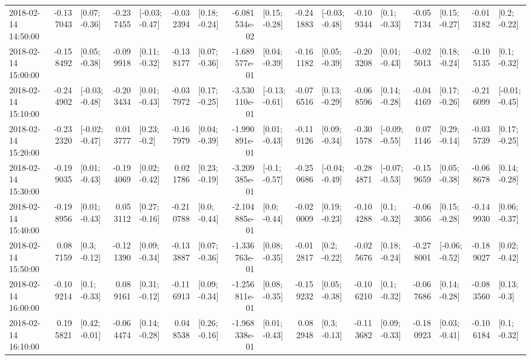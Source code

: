 \begin{tabular}{lrlrlrlrlrlrlrlrl}
2018-02-14 14:50:00 & -0.137043 &   [0.07; -0.36] & -0.237455 &  [-0.03; -0.47] & -0.032394 &   [0.18; -0.24] & -6.081534e-02 &   [0.15; -0.28] & -0.241883 &  [-0.03; -0.48] & -0.109344 &    [0.1; -0.33] & -0.057134 &   [0.15; -0.27] & -0.013182 &    [0.2; -0.22] \\
2018-02-14 15:00:00 & -0.158492 &   [0.05; -0.38] & -0.099918 &   [0.11; -0.32] & -0.138177 &   [0.07; -0.36] & -1.689577e-01 &   [0.04; -0.39] & -0.161182 &   [0.05; -0.39] & -0.203208 &   [0.01; -0.43] & -0.025013 &   [0.18; -0.24] & -0.105135 &    [0.1; -0.32] \\
2018-02-14 15:10:00 & -0.244902 &  [-0.03; -0.48] & -0.203434 &   [0.01; -0.43] & -0.037972 &   [0.17; -0.25] & -3.530110e-01 &  [-0.13; -0.61] & -0.076516 &   [0.13; -0.29] & -0.068596 &   [0.14; -0.28] & -0.044169 &   [0.17; -0.26] & -0.216099 &  [-0.01; -0.45] \\
2018-02-14 15:20:00 & -0.232320 &  [-0.02; -0.47] &  0.013777 &    [0.23; -0.2] & -0.167979 &   [0.04; -0.39] & -1.990891e-01 &   [0.01; -0.43] & -0.119126 &   [0.09; -0.34] & -0.301578 &  [-0.09; -0.55] &  0.071146 &   [0.29; -0.14] & -0.035739 &   [0.17; -0.25] \\
2018-02-14 15:30:00 & -0.199035 &   [0.01; -0.43] & -0.194069 &   [0.02; -0.42] &  0.021786 &   [0.23; -0.19] & -3.209385e-01 &   [-0.1; -0.57] & -0.250686 &  [-0.04; -0.49] & -0.284871 &  [-0.07; -0.53] & -0.159659 &   [0.05; -0.38] & -0.068678 &   [0.14; -0.28] \\
2018-02-14 15:40:00 & -0.198956 &   [0.01; -0.43] &  0.053112 &   [0.27; -0.16] & -0.210788 &    [0.0; -0.44] & -2.104885e-01 &    [0.0; -0.44] & -0.020009 &   [0.19; -0.23] & -0.104288 &    [0.1; -0.32] & -0.063056 &   [0.15; -0.28] & -0.149930 &   [0.06; -0.37] \\
2018-02-14 15:50:00 &  0.087159 &    [0.3; -0.12] & -0.121390 &   [0.09; -0.34] & -0.133887 &   [0.07; -0.36] & -1.336763e-01 &   [0.08; -0.35] & -0.012817 &    [0.2; -0.22] & -0.025676 &   [0.18; -0.24] & -0.278001 &  [-0.06; -0.52] & -0.189027 &   [0.02; -0.42] \\
2018-02-14 16:00:00 & -0.109214 &    [0.1; -0.33] &  0.089161 &   [0.31; -0.12] & -0.116913 &   [0.09; -0.34] & -1.256811e-01 &   [0.08; -0.35] & -0.159232 &   [0.05; -0.38] & -0.106210 &    [0.1; -0.32] & -0.067686 &   [0.14; -0.28] & -0.083560 &    [0.13; -0.3] \\
2018-02-14 16:10:00 &  0.195821 &   [0.42; -0.01] & -0.064474 &   [0.14; -0.28] &  0.048538 &   [0.26; -0.16] & -1.968338e-01 &   [0.01; -0.43] &  0.082948 &    [0.3; -0.13] & -0.113682 &   [0.09; -0.33] & -0.180923 &   [0.03; -0.41] & -0.106184 &    [0.1; -0.32] \\

\end{tabular}
